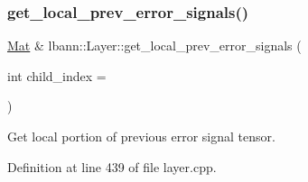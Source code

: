 \subsubsection{\texorpdfstring{get\+\_\+local\+\_\+prev\+\_\+error\+\_\+signals()}{get\_local\_prev\_error\_signals()}\hspace{0.1cm}{\footnotesize\ttfamily [1/2]}}
{\footnotesize\ttfamily \hyperlink{base_8hpp_a68f11fdc31b62516cb310831bbe54d73}{Mat} \& lbann\+::\+Layer\+::get\+\_\+local\+\_\+prev\+\_\+error\+\_\+signals (\begin{DoxyParamCaption}\item[{int}]{child\+\_\+index = {} }\end{DoxyParamCaption})}

Get local portion of previous error signal tensor. 

Definition at line 439 of file layer.\+cpp.


